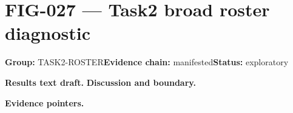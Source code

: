 \clearpage
\section{FIG-027 --- Task2 broad roster diagnostic}
\label{figpage:fig-027}
\textbf{Group:} TASK2-ROSTER\quad \textbf{Evidence chain:} manifested\quad \textbf{Status:} exploratory

\textbf{Results text draft.} 
\textbf{Discussion and boundary.} 


\textbf{Evidence pointers.}



\vfill
